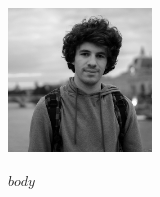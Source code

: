 \documentclass[a4paper, 12pt]{article}
\begin{document}
\begin{flushright}
\includegraphics[width=1.5in]{images/avatar.jpg}
\end{flushright}

\vspace{-1.2in}

$body$
\end{document}
